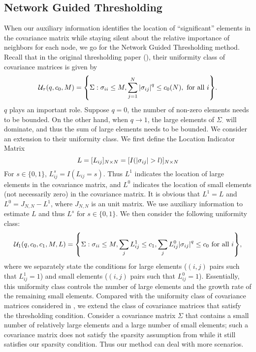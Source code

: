 \subsection{Network Guided Thresholding}{\label{framework1}}
When our auxiliary information identifies the location of “significant” elements in the covariance matrix while staying silent about the relative importance of neighbors for each node, we go for the Network Guided Thresholding method.  Recall that in the original thresholding paper (\cite{bickel2008CovarianceRegularization}), their uniformity class of covariance matrices is given by
\begin{equation*}
    \mathcal{U}_{\tau}(q, c_{0} , M) = \Bqty{\Sigma: \sigma_{ii} \leq M, \sum_{j=1}^{N} \abs{\sigma_{ij}}^{q} \leq c_{0}(N), \mbox{ for all } i}.
\end{equation*}
\(q\) plays an important role. Suppose \(q = 0\), the number of non-zero elements needs to be bounded. On the other hand, when \(q \to 1\), the large elements of \(\Sigma_{\cdot}\) will dominate, and thus the sum of large elements needs to be bounded. We consider an extension to their uniformity class.  We first define the Location Indicator Matrix
\begin{equation}
    L = [L_{ij}]_{N\times N} = [ I(\abs{\sigma_{ij}} > l)]_{N\times N}
    \label{L aux_set}
\end{equation}
For $s\in \{0, 1\}$, $L_{ij}^s = I(L_{ij}=s)$. Thus $L^1$ indicates the location of large elements in the covariance matrix, and $L^0$ indicates the location of small elements (not necessarily zero) in the covariance matrix. It is obvious that $L^1=L$ and $L^0=J_{N,N}-L^1$, where $J_{N,N}$ is an unit matrix. We use auxiliary information to estimate $L$ and thus $L^s$ for $s\in \{0, 1\}$. We then consider the following uniformity class:
\begin{align*}
    \mathcal{U}_1 (q, c_{0}, c_{1}, M, L) = \Bqty{\Sigma : \sigma_{ii} \leq M, \sum_{j} L_{ij}^{1} \leq c_{1}, \sum_{j} L_{ij}^{0}\abs{\sigma_{ij}}^{q} \leq c_{0} \mbox{ for all } i},
\end{align*}
where we separately state the conditions for large elements ($(i,j)$ pairs such that $L_{ij}^{1}=1$) and small elements ($(i,j)$ pairs such that $L_{ij}^{0}=1$). Essentially, this uniformity class controls the number of large elements and the growth rate of the remaining small elements. Compared with the uniformity class of covariance matrices considered in \cite{bickel2008CovarianceRegularization}, we extend the class of covariance matrices that satisfy the thresholding condition. 
Consider a covariance matrix \(\Sigma\) that contains a small number of relatively large elements and a large number of small elements; such a covariance matrix does not satisfy the sparsity assumption from \cite{bickel2008CovarianceRegularization} while it still satisfies our sparsity condition. Thus our method can deal with more scenarios.

